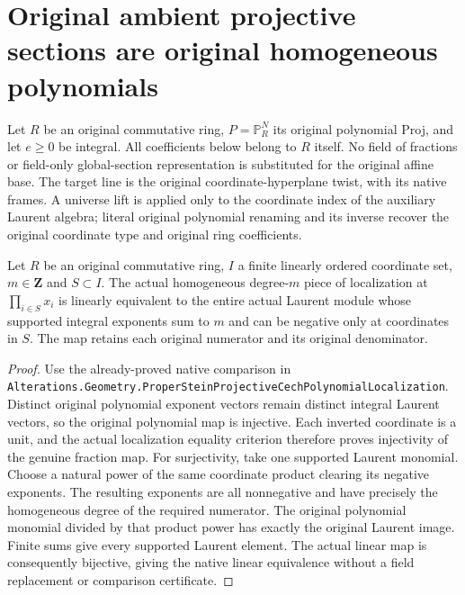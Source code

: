 \section{Original ambient projective sections are original homogeneous polynomials}
\label{sec:c0n-ambient-section-polynomials}

Let $R$ be an original commutative ring, $P=\mathbb P_R^N$ its original
polynomial Proj, and let $e\geq0$ be integral. All coefficients below
belong to $R$ itself. No field of fractions or field-only global-section
representation is substituted for the original affine base. The target
line is the original coordinate-hyperplane twist, with its native frames.
A universe lift is applied only to the coordinate index of the auxiliary
Laurent algebra; literal original polynomial renaming and its inverse
recover the original coordinate type and original ring coefficients.

\begin{lemma}
\label{lem:c0n-native-coordinate-laurent-comparison}
\leanok
Let $R$ be an original commutative ring, $I$ a finite linearly ordered
coordinate set, $m\in\mathbf Z$ and $S\subset I$.  The actual homogeneous
degree-$m$ piece of localization at $\prod_{i\in S}x_i$ is linearly
equivalent to the entire actual Laurent module whose supported integral
exponents sum to $m$ and can be negative only at coordinates in $S$.
The map retains each original numerator and its original denominator.
\end{lemma}
\begin{proof}
Use the already-proved native comparison in
\nolinkurl{Alterations.Geometry.ProperSteinProjectiveCechPolynomialLocalization}.
Distinct original polynomial exponent vectors remain distinct integral
Laurent vectors, so the original polynomial map is injective.  Each
inverted coordinate is a unit, and the actual localization equality
criterion therefore proves injectivity of the genuine fraction map.
For surjectivity, take one supported Laurent monomial.  Choose a natural
power of the same coordinate product clearing its negative exponents.
The resulting exponents are all nonnegative and have precisely the
homogeneous degree of the required numerator.  The original polynomial
monomial divided by that product power has exactly the original Laurent
image.  Finite sums give every supported Laurent element.  The actual
linear map is consequently bijective, giving the native linear
equivalence without a field replacement or comparison certificate.
\end{proof}


